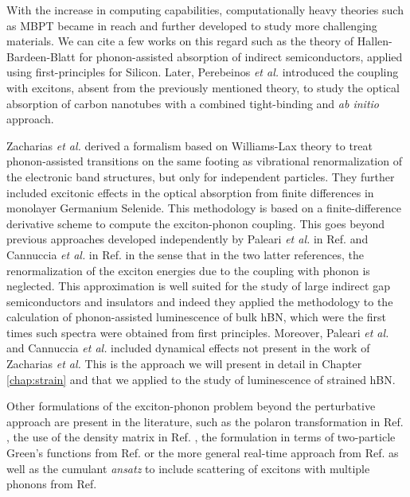 With the increase in computing capabilities, computationally heavy theories such as \acrshort{MBPT} became in reach and further developed to study more challenging materials. We can cite a few works on this regard such as the theory of Hallen-Bardeen-Blatt for phonon-assisted absorption of indirect semiconductors, \cite{hall1954infrared} applied using first-principles for Silicon.\cite{noffsinger2012phonon} Later, Perebeinos \textit{et al.} introduced the coupling with excitons, absent from the previously mentioned theory, to study the optical absorption of carbon nanotubes with a combined tight-binding and \textit{ab initio} approach.\cite{perebeinos2005effect}

Zacharias \textit{et al.} derived a formalism based on Williams-Lax theory\cite{williams1951theoretical,lax1952franck} to treat phonon-assisted transitions on the same footing as vibrational renormalization of the electronic band structures, but only for independent particles.\cite{zacharias2016one} They further included excitonic effects in the optical absorption from finite differences \cite{huang2021exciton} in monolayer Germanium Selenide. This methodology is based on a finite-difference derivative scheme to compute the exciton-phonon coupling. This goes beyond previous approaches developed independently by Paleari \textit{et al.} in Ref. \cite{paleari2019exciton} and Cannuccia \textit{et al.} in Ref. \cite{cannuccia2019theory} in the sense that in the two latter references, the renormalization of the exciton energies due to the coupling with phonon is neglected. This approximation is well suited for the study of large indirect gap semiconductors and insulators and indeed they applied the methodology to the calculation of phonon-assisted luminescence of bulk hBN, which were the first times such spectra were obtained from first principles. Moreover, Paleari \textit{et al.} and Cannuccia \textit{et al.} included dynamical effects not present in the work of Zacharias \textit{et al.} This is the approach we will present in detail in Chapter \ref{chap:strain} and that we applied to the study of luminescence of strained hBN. 

Other formulations of the exciton-phonon problem beyond the perturbative approach are present in the literature, such as the polaron transformation in Ref. \cite{feldtmann2009phonon}, the use of the density matrix in Ref. \cite{brem2020phonon}, the formulation in terms of two-particle Green's functions from Ref. \cite{antonius2017theory} or the more general real-time approach from Ref. \cite{paleari2022exciton} as well as the cumulant \textit{ansatz} to include scattering of excitons with multiple phonons from Ref. \cite{cudazzo2020first} 

